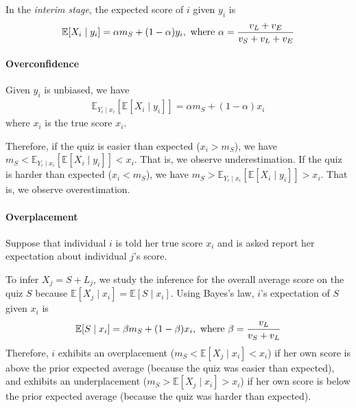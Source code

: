 \documentclass[11pt]{elegantbook}
\begin{document}
In the \textit{interim stage}, the expected score of $i$ given $y_i$ is
\begin{equation}
    \begin{aligned}
        \mathbb{E}[X_i\mid y_i]=\alpha m_S +(1-\alpha)y_i, \textnormal{ where }\alpha=\frac{v_L+v_E}{v_S+v_L+v_E}
    \end{aligned}
    \nonumber
\end{equation}
\paragraph*{Overconfidence} Given $y_i$ is unbiased, we have
\begin{equation}
    \begin{aligned}
        \mathbb{E}_{Y_i\mid x_i}[\mathbb{E}[X_i\mid y_i]]=\alpha m_S +(1-\alpha)x_i
    \end{aligned}
    \nonumber
\end{equation}
where $x_i$ is the true score $x_i$.

Therefore, if the quiz is easier than expected ($x_i>m_S$), we have $m_S<\mathbb{E}_{Y_i\mid x_i}[\mathbb{E}[X_i\mid y_i]]<x_i$. That is, we observe underestimation. If the quiz is harder than expected ($x_i<m_S$), we have $m_S>\mathbb{E}_{Y_i\mid x_i}[\mathbb{E}[X_i\mid y_i]]>x_i$. That is, we observe overestimation.

\paragraph*{Overplacement}
Suppose that individual $i$ is told her true score $x_i$ and is asked report her expectation about individual $j$'s score.

To infer $X_j=S+L_j$, we study the inference for the overall average score on the quiz $S$ because $\mathbb{E}[X_j\mid x_i]=\mathbb{E}[S\mid x_i]$. Using Bayes's law, $i$'s expectation of $S$ given $x_i$ is
\begin{equation}
    \begin{aligned}
        \mathbb{E}[S\mid x_i]=\beta m_S + (1-\beta)x_i, \textnormal{ where }\beta=\frac{v_L}{v_S+v_L}
    \end{aligned}
    \nonumber
\end{equation}
Therefore, $i$ exhibits an overplacement ($m_S<\mathbb{E}[X_j\mid x_i]<x_i$) if her own score is above the prior expected average (because the quiz was easier than expected), and exhibits an underplacement ($m_S>\mathbb{E}[X_j\mid x_i]>x_i$) if her own score is below the prior expected average (because the quiz was harder than expected).
\end{document}
